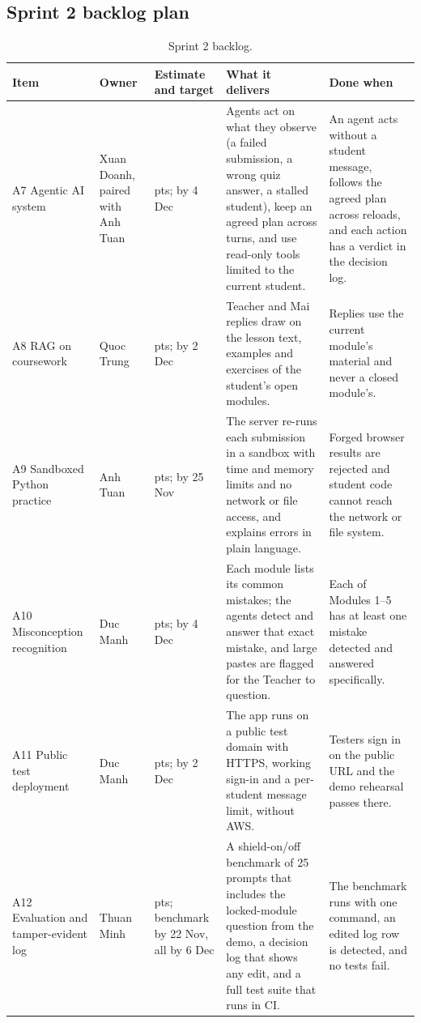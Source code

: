 \documentclass[11pt,a4paper]{article}
\begin{document}
\subsection{Sprint 2 backlog plan}
{\footnotesize
\begin{longtable}{>{\raggedright\arraybackslash}p{}>{\raggedright\arraybackslash}p{}>{\raggedright\arraybackslash}p{}>{\raggedright\arraybackslash}p{}>{\raggedright\arraybackslash}p{}}
\caption{Sprint 2 backlog.}\\
\toprule
\textbf{Item} & \textbf{Owner} & \textbf{Estimate and target} & \textbf{What it delivers} & \textbf{Done when} \\
\midrule
\endhead
A7 Agentic AI system & Xuan Doanh, paired with Anh Tuan & 8 pts; by 4 Dec & Agents act on what they observe (a failed submission, a wrong quiz answer, a stalled student), keep an agreed plan across turns, and use read-only tools limited to the current student. & An agent acts without a student message, follows the agreed plan across reloads, and each action has a verdict in the decision log. \\
A8 RAG on coursework & Quoc Trung & 8 pts; by 2 Dec & Teacher and Mai replies draw on the lesson text, examples and exercises of the student's open modules. & Replies use the current module's material and never a closed module's. \\
A9 Sandboxed Python practice & Anh Tuan & 8 pts; by 25 Nov & The server re-runs each submission in a sandbox with time and memory limits and no network or file access, and explains errors in plain language. & Forged browser results are rejected and student code cannot reach the network or file system. \\
A10 Misconception recognition & Duc Manh & 5 pts; by 4 Dec & Each module lists its common mistakes; the agents detect and answer that exact mistake, and large pastes are flagged for the Teacher to question. & Each of Modules 1--5 has at least one mistake detected and answered specifically. \\
A11 Public test deployment & Duc Manh & 5 pts; by 2 Dec & The app runs on a public test domain with HTTPS, working sign-in and a per-student message limit, without AWS. & Testers sign in on the public URL and the demo rehearsal passes there. \\
A12 Evaluation and tamper-evident log & Thuan Minh & 8 pts; benchmark by 22 Nov, all by 6 Dec & A shield-on/off benchmark of 25 prompts that includes the locked-module question from the demo, a decision log that shows any edit, and a full test suite that runs in CI. & The benchmark runs with one command, an edited log row is detected, and no tests fail. \\
\bottomrule
\end{longtable}}
\end{document}
